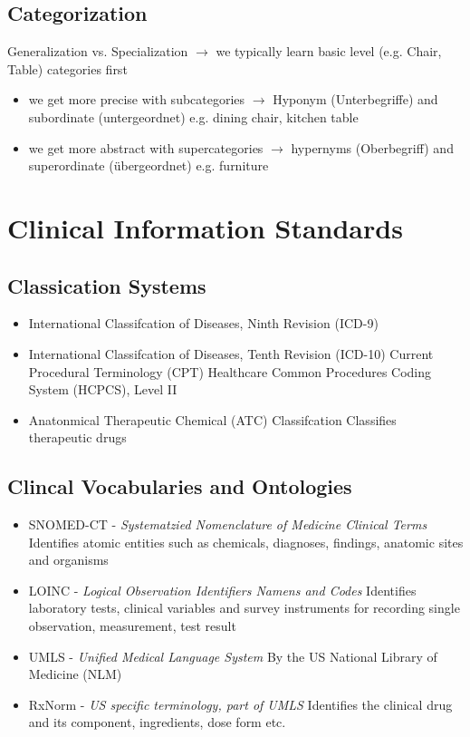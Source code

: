 \documentclass{report}
\theoremstyle{definition}
\theoremstyle{example}
\begin{document}
\subsection{Categorization}
Generalization vs. Specialization $\rightarrow$ we typically learn basic level (e.g. Chair, Table) categories first\\
\begin{itemize}
   \item we get more precise with subcategories $\rightarrow$ Hyponym (Unterbegriffe) and subordinate (untergeordnet) e.g. dining chair, kitchen table
   \item we get more abstract with supercategories $\rightarrow$ hypernyms (Oberbegriff) and superordinate (übergeordnet) e.g. furniture
\end{itemize}

\section{Clinical Information Standards}

\subsection{Classication Systems}
\begin{itemize}
   \item International Classifcation of Diseases, Ninth Revision (ICD-9)
   \item International Classifcation of Diseases, Tenth Revision (ICD-10)
   \subitem Current Procedural Terminology (CPT)
   \subitem Healthcare Common Procedures Coding System (HCPCS), Level II
   \item Anatonmical Therapeutic Chemical (ATC) Classifcation
   \subitem Classifies therapeutic drugs 
\end{itemize}

\subsection{Clincal Vocabularies and Ontologies}
\begin{itemize}
   \item SNOMED-CT - \textit{Systematzied Nomenclature of Medicine Clinical Terms}
   \subitem Identifies atomic entities such as chemicals, diagnoses, findings, anatomic sites and organisms
   \item LOINC - \textit{Logical Observation Identifiers Namens and Codes}
   \subitem Identifies laboratory tests, clinical variables and survey instruments
   \subitem for recording single observation, measurement, test result 
   \item UMLS - \textit{Unified Medical Language System}
   \subitem By the US National Library of Medicine (NLM) 
   \item RxNorm - \textit{US specific terminology, part of UMLS}
   \subitem Identifies the clinical drug and its component, ingredients, dose form etc. 
\end{itemize}
\end{document}
